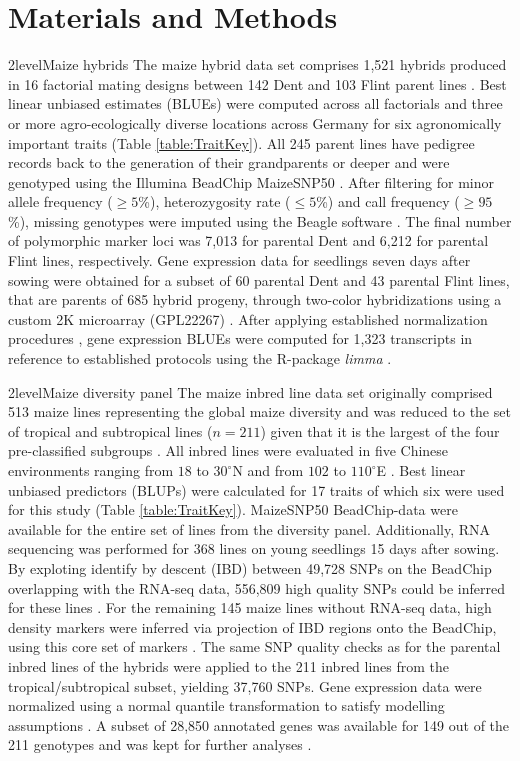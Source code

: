 \documentclass[12pt,titlepage]{article}
\begin{document}
\section{Materials and Methods}
\Genetics2level{Maize hybrids}
The maize hybrid data set comprises 1,521 hybrids produced in 16 factorial
mating designs between 142 Dent and 103 Flint parent lines \cite{Westhues2017}. 
Best linear unbiased estimates (BLUEs) were computed across all factorials and 
three or more agro-ecologically diverse locations across Germany for six 
agronomically important traits (Table \ref{table:TraitKey}).
All 245 parent lines have pedigree records back to the generation of their 
grandparents or deeper \cite{Westhues2017} and were genotyped using the Illumina 
BeadChip MaizeSNP50 \cite{Ganal2011}.
After filtering for minor allele frequency ($\geq 5$\%), heterozygosity rate
($\leq 5$\%) and call frequency ($\geq 95$\%), missing genotypes were imputed 
using the Beagle software \cite{Browning2009}.
The final number of polymorphic marker loci was 7,013 for parental Dent and
6,212 for parental Flint lines, respectively.
Gene expression data for seedlings seven days after sowing were obtained for a 
subset of 60 parental Dent and 43 parental Flint lines, that are parents of 685
hybrid progeny, through two-color hybridizations using a custom 2K microarray 
(GPL22267) \cite{Westhues2017}.
After applying established normalization procedures 
\cite{Smyth2003,Ritchie2007}, gene expression BLUEs were computed for 1,323 
transcripts in reference to established protocols 
\cite{Smyth2003,Ritchie2007,Frisch2010} using the R-package \textit{limma}
\cite{Ritchie2015a}.



\Genetics2level{Maize diversity panel}
The maize inbred line data set originally comprised 513 maize lines representing 
the global maize diversity and was reduced to the set of tropical and
subtropical lines ($n = 211$) given that it is the largest of the four
pre-classified subgroups \cite{Yang2014}.
All inbred lines were evaluated in five Chinese environments ranging from
$18$ to $30^{\circ}$N and from $102$ to $110^{\circ}$E \cite{Yang2014}.
Best linear unbiased predictors (BLUPs) were calculated for 17 traits of which 
six were used for this study (Table \ref{table:TraitKey}).
MaizeSNP50 BeadChip-data were available for the entire set of lines from the
diversity panel.
Additionally, RNA sequencing was performed for 368 lines on young seedlings 15 
days after sowing.
By exploting identify by descent (IBD) between 49,728 SNPs on the BeadChip 
overlapping with the RNA-seq data, 556,809 high quality SNPs could be inferred 
for these lines \cite{Fu2013,Li2013}.
For the remaining 145 maize lines without RNA-seq data, high density markers
were inferred via projection of IBD regions onto the BeadChip, using this core 
set of markers \cite{Yang2014}.
The same SNP quality checks as for the parental inbred lines of the hybrids
were applied to the 211 inbred lines from the tropical/subtropical subset,
yielding 37,760 SNPs.
Gene expression data were normalized using a normal quantile transformation to
satisfy modelling assumptions \cite{Fu2013}.
A subset of 28,850 annotated genes was available for 149 out of the 211
genotypes and was kept for further analyses \cite{Li2013}.
\end{document}
